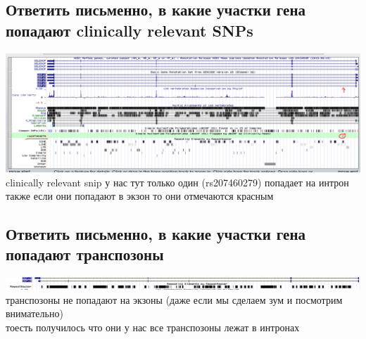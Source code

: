 \documentclass{article}
\begin{document}
  \subsection{Ответить письменно, в какие участки гена попадают clinically relevant SNPs}
  \includegraphics[width=\textwidth]{./bio/hw1/snip.png}
  clinically relevant snip у нас тут только один (rs207460279) попадает на интрон \\
  также если они попадают в экзон то они отмечаются красным

  \subsection{Ответить письменно, в какие участки гена попадают транспозоны}
  \includegraphics[width=\textwidth]{./bio/hw1/copy.png}
  транспозоны не попадают на экзоны (даже если мы сделаем зум и посмотрим внимательно) \\
  тоесть получилось что они у нас все транспозоны лежат в интронах
\end{document}

